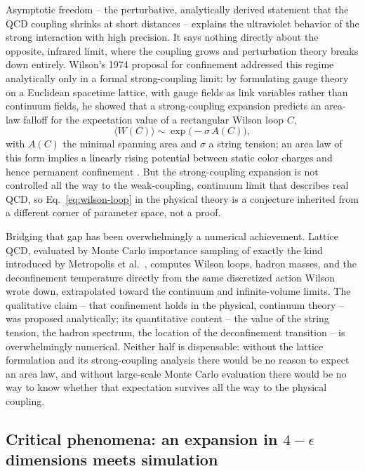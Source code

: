 \documentclass[11pt]{article}
\begin{document}
Asymptotic freedom -- the perturbative, analytically derived statement that the QCD coupling shrinks at short distances -- explains the ultraviolet behavior of the strong interaction with high precision. It says nothing directly about the opposite, infrared limit, where the coupling grows and perturbation theory breaks down entirely. Wilson's 1974 proposal for confinement addressed this regime analytically only in a formal strong-coupling limit: by formulating gauge theory on a Euclidean spacetime lattice, with gauge fields as link variables rather than continuum fields, he showed that a strong-coupling expansion predicts an area-law falloff for the expectation value of a rectangular Wilson loop $C$,
\begin{equation}
\langle W(C) \rangle \sim \exp\!\big(-\sigma \, A(C)\big),
\label{eq:wilson-loop}
\end{equation}
with $A(C)$ the minimal spanning area and $\sigma$ a string tension; an area law of this form implies a linearly rising potential between static color charges and hence permanent confinement \cite{Wilson1974}. But the strong-coupling expansion is not controlled all the way to the weak-coupling, continuum limit that describes real QCD, so Eq.~\eqref{eq:wilson-loop} in the physical theory is a conjecture inherited from a different corner of parameter space, not a proof.

Bridging that gap has been overwhelmingly a numerical achievement. Lattice QCD, evaluated by Monte Carlo importance sampling of exactly the kind introduced by Metropolis et al.\ \cite{Metropolis1953}, computes Wilson loops, hadron masses, and the deconfinement temperature directly from the same discretized action Wilson wrote down, extrapolated toward the continuum and infinite-volume limits. The qualitative claim -- that confinement holds in the physical, continuum theory -- was proposed analytically; its quantitative content -- the value of the string tension, the hadron spectrum, the location of the deconfinement transition -- is overwhelmingly numerical. Neither half is dispensable: without the lattice formulation and its strong-coupling analysis there would be no reason to expect an area law, and without large-scale Monte Carlo evaluation there would be no way to know whether that expectation survives all the way to the physical coupling.

\subsection{Critical phenomena: an expansion in $4-\epsilon$ dimensions meets simulation}
\end{document}

